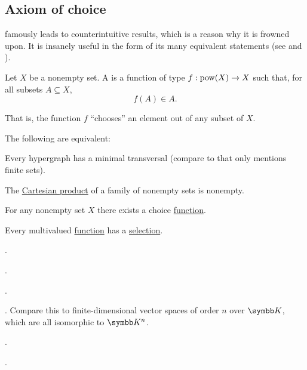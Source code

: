 \subsection{Axiom of choice}\label{subsec:axiom_of_choice}

\begin{remark}\label{remark:aoc}
   famously leads to counterintuitive results, which is a reason why it is frowned upon. It is insanely useful in the form of its many equivalent statements (see  and ).
\end{remark}

\begin{definition}\label{def:choice_function}
  Let \( X \) be a nonempty set. A  is a function of type \( f: \operatorname{pow}(X) \to X \) such that, for all subsets \( A \subseteq X \),
  \begin{equation*}
    f(A) \in A.
  \end{equation*}

  That is, the function \( f \) \enquote{chooses} an element out of any subset of \( X \).
\end{definition}

\begin{theorem}\label{thm:aoc}
  The following are equivalent:

  \begin{thmenum}
    \cite[theorem 6M(4)]{Enderton1977} Every hypergraph has a minimal transversal (compare to  that only mentions finite sets).

    \cite[theorem 6M(2)]{Enderton1977} The \hyperref[def:cartesian_product]{Cartesian product} of a family of nonempty sets is nonempty.

    \cite[theorem 6M(3)]{Enderton1977} For any nonempty set \( X \) there exists a choice \hyperref[def:choice_function]{function}.

    \cite[theorem 6M(1)]{Enderton1977} Every multivalued \hyperref[def:function]{function} has a \hyperref[def:function/selection]{selection}.

     .

     .

     .

     . Compare this to finite-dimensional vector spaces of order \( n \) over \( \BK \), which are all isomorphic to \( \BK^n \).

     .

     .
  \end{thmenum}
\end{theorem}
